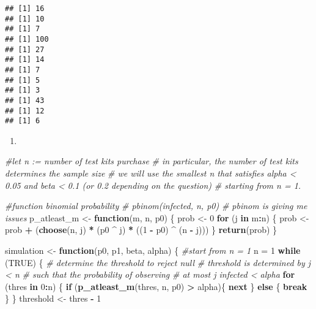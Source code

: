 \documentclass[
  12pt,
  landscape]{article}
\newenvironment{Shaded}{\begin{snugshade}}{\end{snugshade}}
\newcommand{\CommentTok}[1]{\textcolor[rgb]{0.56,0.35,0.01}{\textit{#1}}}
\newcommand{\ControlFlowTok}[1]{\textcolor[rgb]{0.13,0.29,0.53}{\textbf{#1}}}
\newcommand{\DecValTok}[1]{\textcolor[rgb]{0.00,0.00,0.81}{#1}}
\newcommand{\KeywordTok}[1]{\textcolor[rgb]{0.13,0.29,0.53}{\textbf{#1}}}
\newcommand{\NormalTok}[1]{#1}
\newcommand{\OperatorTok}[1]{\textcolor[rgb]{0.81,0.36,0.00}{\textbf{#1}}}
\newcommand{\OtherTok}[1]{\textcolor[rgb]{0.56,0.35,0.01}{#1}}
\newcommand{\StringTok}[1]{\textcolor[rgb]{0.31,0.60,0.02}{#1}}
\begin{document}
\begin{verbatim}
## [1] 16
## [1] 10
## [1] 7
## [1] 100
## [1] 27
## [1] 14
## [1] 7
## [1] 5
## [1] 3
## [1] 43
## [1] 12
## [1] 6
\end{verbatim}

\begin{enumerate}
\def\labelenumi{(\alph{enumi})}
\setcounter{enumi}{7}
\item
\end{enumerate}

\begin{Shaded}
\begin{Highlighting}[]
\CommentTok{#let n := number of test kits purchase}
\CommentTok{# in particular, the number of test kits determines the sample size}
\CommentTok{# we will use the smallest n that satisfies alpha < 0.05 and beta < 0.1 (or 0.2 depending on the question)}
\CommentTok{# starting from n = 1.}

\CommentTok{#function binomial probability}
\CommentTok{# pbinom(infected, n, p0)}
\CommentTok{# pbinom is giving me issues}
\NormalTok{p_atleast_m <-}\StringTok{ }\ControlFlowTok{function}\NormalTok{(m, n, p0) \{}
\NormalTok{    prob <-}\StringTok{ }\DecValTok{0}
    \ControlFlowTok{for}\NormalTok{ (j }\ControlFlowTok{in}\NormalTok{ m}\OperatorTok{:}\NormalTok{n) \{}
\NormalTok{        prob <-}\StringTok{ }\NormalTok{prob }\OperatorTok{+}\StringTok{ }\NormalTok{(}\KeywordTok{choose}\NormalTok{(n, j) }\OperatorTok{*}\StringTok{ }\NormalTok{(p0 }\OperatorTok{^}\StringTok{ }\NormalTok{j) }\OperatorTok{*}\StringTok{ }\NormalTok{((}\DecValTok{1} \OperatorTok{-}\StringTok{ }\NormalTok{p0) }\OperatorTok{^}\StringTok{ }\NormalTok{(n }\OperatorTok{-}\StringTok{ }\NormalTok{j)))}
\NormalTok{    \}}
    \KeywordTok{return}\NormalTok{(prob)}
\NormalTok{\}}

\NormalTok{simulation <-}\StringTok{ }\ControlFlowTok{function}\NormalTok{(p0, p1, beta, alpha) \{}
    \CommentTok{#start from n = 1}
\NormalTok{    n =}\StringTok{ }\DecValTok{1}
    \ControlFlowTok{while}\NormalTok{ (}\OtherTok{TRUE}\NormalTok{) \{}
        \CommentTok{#   determine the threshold to reject null}
        \CommentTok{#   threshold is determined by j < n }
        \CommentTok{#   such that the probability of observing }
        \CommentTok{#   at most j infected < alpha}
        \ControlFlowTok{for}\NormalTok{ (thres }\ControlFlowTok{in} \DecValTok{0}\OperatorTok{:}\NormalTok{n) \{}
            \ControlFlowTok{if}\NormalTok{ (}\KeywordTok{p_atleast_m}\NormalTok{(thres, n, p0) }\OperatorTok{>}\StringTok{ }\NormalTok{alpha)\{}
                \ControlFlowTok{next}
\NormalTok{            \} }\ControlFlowTok{else}\NormalTok{ \{}
                \ControlFlowTok{break}
\NormalTok{            \}}
\NormalTok{        \}}
\NormalTok{        threshold <-}\StringTok{ }\NormalTok{thres }\OperatorTok{-}\StringTok{ }\DecValTok{1}
        

\end{Highlighting}
\end{Shaded}
\end{document}
